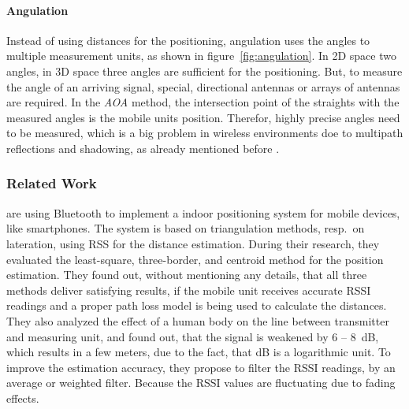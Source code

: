 \paragraph{Angulation} Instead of using distances for the positioning, angulation uses the angles to multiple measurement units, as shown in figure~\ref{fig:angulation}. In 2D space two angles, in 3D space three angles are sufficient for the positioning. But, to measure the angle of an arriving signal, special, directional antennas or arrays of antennas are required. In the \emph{\ac{AOA}} method, the intersection point of the straights with the measured angles is the mobile units position. Therefor, highly precise angles need to be measured, which is a big problem in wireless environments doe to multipath reflections and shadowing, as already mentioned before \citep{IEEE:survey_wireless_indoor_pos, wang:bt_pos}.

\subsubsection*{Related Work}
\citet{wang:bt_pos} are using Bluetooth to implement a indoor positioning system for mobile devices, like smartphones. The system is based on triangulation methods, resp.\ on lateration, using \acs{RSS} for the distance estimation. During their research, they evaluated the least-square, three-border, and centroid method for the position estimation. They found out, without mentioning any details, that all three methods deliver satisfying results, if the mobile unit receives accurate \acs{RSSI} readings and a proper path loss model is being used to calculate the distances. They also analyzed the effect of a human body on the line between transmitter and measuring unit, and found out, that the signal is weakened by 6 -- 8~dB, which results in a few meters, due to the fact, that dB is a logarithmic unit. To improve the estimation accuracy, they propose to filter the \acs{RSSI} readings, by an average or weighted filter. Because the \acs{RSSI} values are fluctuating due to fading effects.

